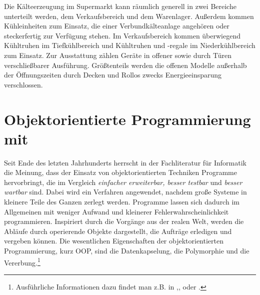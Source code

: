 Die K\"alteerzeugung im Supermarkt kann r\"aumlich generell in zwei Bereiche
unterteilt werden, dem Verkaufsbereich und dem Warenlager. Au\ss erdem kommen
K\"uhleinheiten zum Einsatz, die einer Verbundk\"alteanlage angeh\"oren oder
steckerfertig zur Verf\"ugung stehen. Im Verkaufsbereich kommen \"uberwiegend
K\"uhltruhen im Tiefk\"uhlbereich und K\"uhltruhen und -regale im
Niederk\"uhlbereich zum Einsatz. Zur Ausstattung z\"ahlen Ger\"ate in offener
sowie durch T\"uren verschlie\ss barer Ausf\"uhrung. Gr\"o\ss tenteils werden
die offenen Modelle au\ss erhalb der \"Offnungszeiten durch Decken und Rollos
zwecks Energieeinsparung verschlossen.


\section{Objektorientierte Programmierung mit \matlab}
\label{sec:OOP}
Seit Ende des letzten Jahrhunderts herrscht in der Fachliteratur für Informatik
die Meinung, dass der Einsatz von objektorientierten Techniken Programme
hervorbringt, die im Vergleich \textit{einfacher erweiterbar, besser testbar}
und \textit{besser wartbar} sind. Dabei wird ein Verfahren angewendet, nachdem
große Systeme in kleinere Teile des Ganzen zerlegt werden. Programme lassen sich
dadurch im Allgemeinen mit weniger Aufwand und kleinerer
Fehlerwahrscheinlichkeit programmieren. Inspiriert durch die Vorgänge aus der
realen Welt, werden die Abläufe durch operierende Objekte dargestellt, die
Aufträge erledigen und vergeben können. Die wesentlichen Eigenschaften der
objektorientierten Programmierung, kurz OOP, sind die Datenkapselung, die Polymorphie und die
Vererbung.\footnote{ Ausführliche Informationen dazu findet
man z.B. in \cite{OOP},\cite{pepperOOP},\cite{java} oder \cite{python}.}


